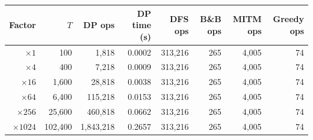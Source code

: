 \begin{tabular}{@{}r r r r r r r r@{}}
\toprule
Factor & $T$ & DP ops & DP time (s) & DFS ops & B\&B ops & MITM ops & Greedy ops\\
\midrule
$\times1$ & 100 & 1,818 & 0.0002 & 313,216 & 265 & 4,005 & 74\\
$\times4$ & 400 & 7,218 & 0.0009 & 313,216 & 265 & 4,005 & 74\\
$\times16$ & 1,600 & 28,818 & 0.0038 & 313,216 & 265 & 4,005 & 74\\
$\times64$ & 6,400 & 115,218 & 0.0153 & 313,216 & 265 & 4,005 & 74\\
$\times256$ & 25,600 & 460,818 & 0.0662 & 313,216 & 265 & 4,005 & 74\\
$\times1024$ & 102,400 & 1,843,218 & 0.2657 & 313,216 & 265 & 4,005 & 74\\
\bottomrule
\end{tabular}
